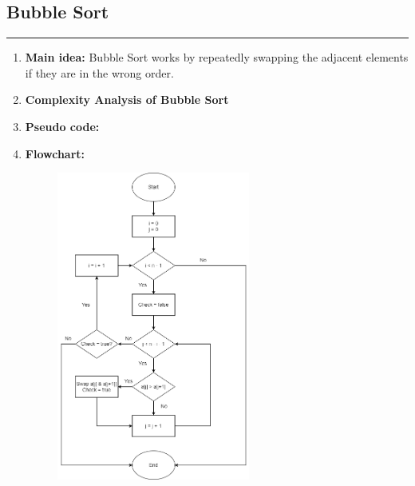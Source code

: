 \documentclass[11pt,a4paper]{article}
\begin{document}
{		\subsection{Bubble Sort}
		\rule{15cm}{0.1cm}
			\begin{enumerate}[label=\textbf{\arabic*})]
				\item \textbf{Main idea:}
				Bubble Sort works by repeatedly swapping the adjacent elements if they are in the wrong order.
				\\[12pt]
				\item \textbf{Complexity Analysis of Bubble Sort}
				\\[12pt]
				\item \textbf{Pseudo code:} 
				\pagebreak
				\item \textbf{Flowchart:}
					\begin{figure}[H]
						\centering 
						\includegraphics[width=0.6\textwidth]{BubbleSortFlowchart}
					\end{figure}
					

\end{enumerate}}
\end{document}
